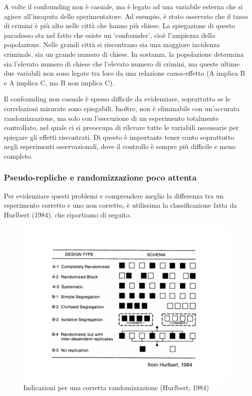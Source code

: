 \documentclass[a4paper,12pt,oneside]{book}
\begin{document}
A volte il confounding non è casuale, ma è legato ad una variabile
esterna che si agisce all'insaputa dello sperimentatore. Ad esempio, è
stato osservato che il tasso di crimini è più alto nelle città che hanno
più chiese. La spiegazione di questo paradosso sta nel fatto che esiste
un `confounder', cioè l'ampiezza della popolazione. Nelle grandi città
si riscontrano sia una maggiore incidenza criminale, sia un grande
numero di chiese. In sostanza, la popolazione determina sia l'elevato
numero di chiese che l'elevato numero di crimini, ma queste ultime due
variabili non sono legate tra loro da una relazione causa-effetto (A
implica B e A implica C, ma B non implica C).

Il confounding non casuale è spesso difficile da evidenziare,
soprattutto se le correlazioni misurate sono spiegabili. Inoltre, non è
eliminabile con un'accurata randomizzazione, ma solo con l'esecuzione di
un esperimento totalmente controllato, nel quale ci si preoccupa di
rilevare tutte le variabili necessarie per spiegare gli effetti
riscontrati. Di questo è importante tener conto soprattutto negli
esperimenti osservazionali, dove il controllo è sempre più difficile e
meno completo.

\subsubsection{Pseudo-repliche e randomizzazione poco
attenta}\label{pseudo-repliche-e-randomizzazione-poco-attenta}

Per evidenziare questi problemi e comprendere meglio la differenza tra
un esperimento corretto e uno non corretto, è utilissima la
classificazione fatta da Hurlbert (1984), che riportiamo di seguito.

\begin{figure}
\centering
\includegraphics{_images/Randomisation.jpg}
\caption{Indicazioni per una corretta randomizzazione (Hurlbert, 1984)}
\end{figure}
\end{document}
